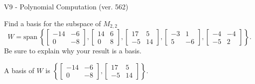 \begin{exercise}
  \begin{exerciseTitle}V9 - Polynomial Computation (ver. 562)\end{exerciseTitle}
  \begin{exerciseStatement}
    Find a basis for the subspace of \(M_{2,2}\) 
\[W=\mathrm{span}\ \left\{\left[\begin{array}{cc}
-14 & -6 \\
0 & -8
\end{array}\right] , \left[\begin{array}{cc}
14 & 6 \\
0 & 8
\end{array}\right] , \left[\begin{array}{cc}
17 & 5 \\
-5 & 14
\end{array}\right] , \left[\begin{array}{cc}
-3 & 1 \\
5 & -6
\end{array}\right] , \left[\begin{array}{cc}
-4 & -4 \\
-5 & 2
\end{array}\right]\right\}.\]
 Be sure to explain why your result is a basis.


  \end{exerciseStatement}
  \begin{exerciseAnswer}
   A basis of \(W\) is  \(\left\{\left[\begin{array}{cc}
-14 & -6 \\
0 & -8
\end{array}\right] , \left[\begin{array}{cc}
17 & 5 \\
-5 & 14
\end{array}\right]\right\}\).
  


  \end{exerciseAnswer}
\end{exercise}